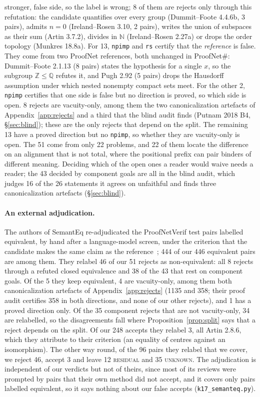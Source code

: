 \documentclass[10pt]{article}
\theoremstyle{definition}
\newcommand{\V}[1]{\textsc{#1}}
\begin{document}
stronger, false side, so the label is wrong; 8 of them are rejects only through this
refutation: the candidate quantifies over every group (Dummit--Foote 4.4.6b, 3 pairs), admits
$n=0$ (Ireland--Rosen 3.10, 2 pairs), writes the union of subspaces as their sum (Artin 3.7.2),
divides in $\mathbb N$ (Ireland--Rosen 2.27a) or drops the order topology (Munkres 18.8a). For 13, \texttt{npimp} and \texttt{rs} certify that
the \emph{reference} is false. They come from two ProofNet references, both unchanged in
ProofNet\#: Dummit--Foote 2.1.13 (8 pairs) states the hypothesis for a single $x$, so the subgroup
$\mathbb Z\le\mathbb Q$ refutes it, and Pugh 2.92 (5 pairs) drops the Hausdorff assumption under
which nested nonempty compact sets meet. For the other 2, \texttt{npimp} certifies that one side
is false but no direction is proved, so which side is open. 8 rejects are vacuity-only, among them the two canonicalization artefacts of
Appendix~\ref{app:rejects} and a third that the blind audit finds (Putnam 2018 B4,
\S\ref{sec:blind}); these are the only rejects that depend on the split. The remaining 13
have a proved direction but no \texttt{npimp}, so whether they are vacuity-only is open. The 51
come from only 22 problems, and 22 of them locate the difference on an alignment that is not
total, where the positional prefix can pair binders of different meaning. Deciding which of the open ones a reader would waive needs
a reader; the 43 decided by component goals are all in the blind audit, which judges 16 of the 26
statements it agrees on unfaithful and finds three canonicalization artefacts (\S\ref{sec:blind}).

\paragraph{An external adjudication.} The authors of SemantEq re-adjudicated the
ProofNetVerif test pairs labelled equivalent, by hand after a language-model screen, under the
criterion that the candidate makes the same claim as the reference~\cite{semanteq}; 444 of our
446 equivalent pairs are among them. They relabel 46 of our 51 rejects as non-equivalent: all 8
rejects through a refuted closed equivalence and 38 of the 43 that rest on component goals. Of
the 5 they keep equivalent, 4 are vacuity-only, among them both canonicalization artefacts of
Appendix~\ref{app:rejects} (1135 and 358; their proof audit certifies 358 in both directions, and
none of our other rejects), and 1 has a proved direction only. Of the 35 component rejects that
are not vacuity-only, 34 are relabelled, so the disagreements fall where
Proposition~\ref{prop:split} says that a reject depends on the split. Of our 248 accepts they
relabel 3, all Artin 2.8.6, which they attribute to their criterion (an equality of centres
against an isomorphism). The other way round, of the 96 pairs they relabel that we cover, we
reject 46, accept 3 and leave 12 \V{residual} and 35 \V{unknown}. The adjudication is
independent of our verdicts but not of theirs, since most of its reviews were prompted by pairs
that their own method did not accept, and it covers only pairs labelled equivalent, so it says
nothing about our false accepts (\texttt{k17\_semanteq.py}).
\end{document}
